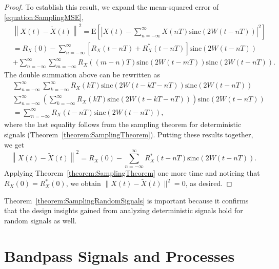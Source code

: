 \begin{proof}
To establish this result, we expand the mean-squared error of \eqref{equation:SamplingMSE},
\begin{equation*}
\begin{split}
&\left\| X(t) - \tilde{X}(t) \right\|^2
= \mathrm{E} \left[ \left| X(t) - \sum_{n=-\infty}^{\infty} X(nT)
\mathrm{sinc}(2 W (t - nT)) \right|^2 \right] \\
&= R_X(0) - \sum_{n=-\infty}^{\infty} [ R_X(t-nT) + R_X^*(t-nT) ]
\mathrm{sinc}(2 W (t - nT)) \\
&+ \sum_{n=-\infty}^{\infty} \sum_{m=-\infty}^{\infty} R_X((m-n)T)
\mathrm{sinc}(2 W (t - mT)) \mathrm{sinc}(2 W (t - nT)) .
\end{split}
\end{equation*}
The double summation above can be rewritten as
\begin{equation*}
\begin{split}
&\sum_{n=-\infty}^{\infty} \sum_{k=-\infty}^{\infty} R_X(kT)
\mathrm{sinc}(2 W (t - kT - nT)) \mathrm{sinc}(2 W (t - nT)) \\
&\sum_{n=-\infty}^{\infty} \left( \sum_{k=-\infty}^{\infty} R_X(kT)
\mathrm{sinc}(2 W (t - kT - nT)) \right) \mathrm{sinc}(2 W (t - nT)) \\
&= \sum_{n=-\infty}^{\infty} R_X(t - nT) \mathrm{sinc}(2 W (t - nT)) ,
\end{split}
\end{equation*}
where the last equality follows from the sampling theorem for deterministic signals (Theorem~\ref{theorem:SamplingTheorem}).
Putting these results together, we get
\begin{equation*}
\left\| X(t) - \tilde{X}(t) \right\|^2
= R_X(0) - \sum_{n=-\infty}^{\infty} R_X^*(t-nT) \mathrm{sinc}(2 W (t - nT)) .
\end{equation*}
Applying Theorem~\ref{theorem:SamplingTheorem} one more time and noticing that $R_X(0) = R_X^*(0)$, we obtain $\| X(t) - \tilde{X}(t) \|^2 = 0$, as desired.
\end{proof}

Theorem~\ref{theorem:SamplingRandomSignals} is important because it confirms that the design insights gained from analyzing deterministic signals hold for random signals as well.


\section{Bandpass Signals and Processes}

